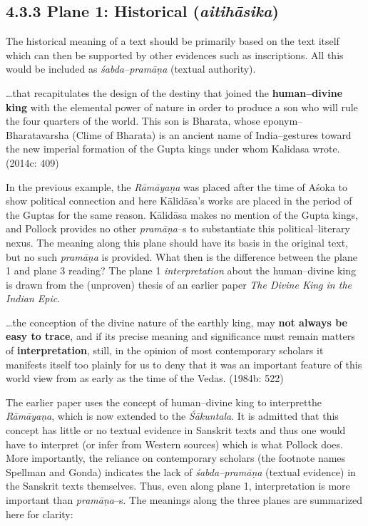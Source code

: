 \newpage

\subsection*{4.3.3 Plane 1: Historical ({\it {\bfseries aitihāsika}})}

The historical meaning of a text should be primarily based on the text itself which can then be supported by other evidences such as inscriptions. All this would be included as \textit{śabda–pramāṇa} (textual authority).

\begin{myquote}
…that recapitulates the design of the destiny that joined the \textbf{human–divine king} with the elemental power of nature in order to produce a son who will rule the four quarters of the world. This son is Bharata, whose eponym–Bharatavarsha (Clime of Bharata) is an ancient name of India–gestures toward the new imperial formation of the Gupta kings under whom Kalidasa wrote. (2014c: 409)
\end{myquote}

In the previous example, the \textit{Rāmāyaṇa }was placed after the time of Aśoka to show political connection and here Kālidāsa’s works are placed in the period of the Guptas for the same reason. Kālidāsa makes no mention of the Gupta kings, and Pollock provides no other \textit{pramāṇa}–s to substantiate this political–literary nexus. The meaning along this plane should have its basis in the original text, but no such \textit{pramāṇa} is provided. What then is the difference between the plane 1 and plane 3 reading? The plane 1 \textit{interpretation} about the human–divine king is drawn from the (unproven) thesis of an earlier paper \textit{The Divine King in the Indian Epic}.

\begin{myquote}
…the conception of the divine nature of the earthly king, may \textbf{not always be easy to trace}, and if its precise meaning and significance must remain matters of \textbf{interpretation}, still, in the opinion of most contemporary scholars it manifests itself too plainly for us to deny that it was an important feature of this world view from as early as the time of the Vedas. (1984b: 522)
\end{myquote}

The earlier paper uses the concept of human–divine king to interpretthe \textit{Rāmāyaṇa}, which is now extended to the \textit{Śākuntala}. It is admitted that this concept has little or no textual evidence in Sanskrit texts and thus one would have to interpret (or infer from Western sources) which is what Pollock does. More importantly, the reliance on contemporary scholars (the footnote names Spellman and Gonda) indicates the lack of \textit{śabda–pramāṇa }(textual evidence) in the Sanskrit texts themselves. Thus, even along plane 1, interpretation is more important than \textit{pramāṇa}–s. The meanings along the three planes are summarized here for clarity:

